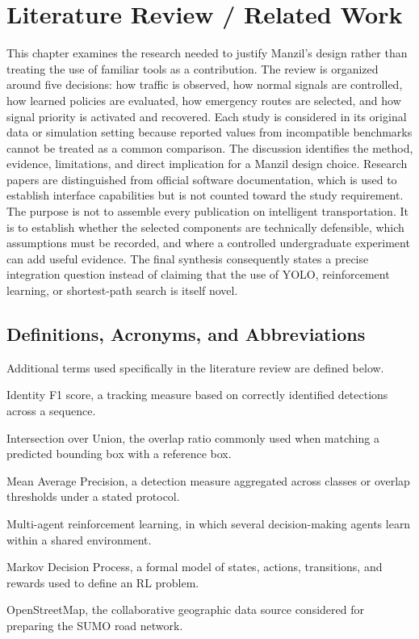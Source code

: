 \chapter{Literature Review / Related Work}
\label{ch:literature}

This chapter examines the research needed to justify Manzil's design rather than treating the use of familiar tools as a contribution. The review is organized around five decisions: how traffic is observed, how normal signals are controlled, how learned policies are evaluated, how emergency routes are selected, and how signal priority is activated and recovered. Each study is considered in its original data or simulation setting because reported values from incompatible benchmarks cannot be treated as a common comparison. The discussion identifies the method, evidence, limitations, and direct implication for a Manzil design choice. Research papers are distinguished from official software documentation, which is used to establish interface capabilities but is not counted toward the study requirement. The purpose is not to assemble every publication on intelligent transportation. It is to establish whether the selected components are technically defensible, which assumptions must be recorded, and where a controlled undergraduate experiment can add useful evidence. The final synthesis consequently states a precise integration question instead of claiming that the use of YOLO, reinforcement learning, or shortest-path search is itself novel.

\section{Definitions, Acronyms, and Abbreviations}

Additional terms used specifically in the literature review are defined below.

\begin{description}[font=\normalfont,leftmargin=0pt,itemindent=0.45em,labelsep=0.45em,itemsep=0.25\baselineskip,parsep=0pt,topsep=0.5\baselineskip]
\item[IDF1:] Identity F1 score, a tracking measure based on correctly identified detections across a sequence.
\item[IoU:] Intersection over Union, the overlap ratio commonly used when matching a predicted bounding box with a reference box.
\item[mAP:] Mean Average Precision, a detection measure aggregated across classes or overlap thresholds under a stated protocol.
\item[MARL:] Multi-agent reinforcement learning, in which several decision-making agents learn within a shared environment.
\item[MDP:] Markov Decision Process, a formal model of states, actions, transitions, and rewards used to define an RL problem.
\item[OSM:] OpenStreetMap, the collaborative geographic data source considered for preparing the SUMO road network.\end{description}

